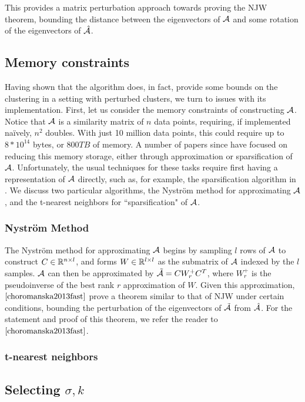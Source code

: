 This provides a matrix perturbation approach towards proving the NJW theorem,
bounding the distance between the eigenvectors of $\mathcal{A}$ and some rotation of
the eigenvectors of $\hat{\mathcal{A}}$.

\subsection{Memory constraints}
Having shown that the algorithm does, in fact, provide some bounds on the
clustering in a setting with perturbed clusters, we turn to issues with its
implementation. First, let us consider the memory constraints of constructing
$\mathcal{A}$. Notice that $\mathcal{A}$ is a similarity matrix of $n$ data points, requiring,
if implemented na\"{i}vely, $n^2$ doubles. With just 10 million data points,
this could require up to $8 * 10^14$ bytes, or $800 TB$ of memory. A number
of papers since have focused on reducing this memory storage, either through
approximation or sparsification of $\mathcal{A}$. Unfortunately, the usual techniques
for these tasks require first having a representation of $\mathcal{A}$ directly, such as,
for example, the sparsification algorithm in \cite{spielman2011graph}. We
discuss two particular algorithms, the Nystr\"{o}m method for approximating
$\mathcal{A}$, and the t-nearest neighbors for ``sparsification" of $\mathcal{A}$.

\subsubsection{Nystr\"{o}m Method}
The Nystr\"{o}m method for approximating $\mathcal{A}$ begins by sampling $l$ rows
of $\mathcal{A}$ to construct $C \in \mathbb{R}^{n \times l}$, and forms $W \in \mathbb{R}^{l \times l}$
as the submatrix of $\mathcal{A}$ indexed by the $l$ samples. $\mathcal{A}$ can then be
approximated by $\tilde{\mathcal{A}} = C W_r^+ C^T$, where $W_r^+$ is the pseudoinverse
of the best rank $r$ approximation of $W$. Given this approximation,
$\cite{choromanska2013fast}$ prove a theorem similar to that of NJW under
certain conditions, bounding the perturbation of the eigenvectors of
$\tilde{\mathcal{A}}$ from $\hat{\mathcal{A}}$. For the statement and proof of this theorem, we
refer the reader to $\cite{choromanska2013fast}$.

\subsubsection{t-nearest neighbors}

\subsection{Selecting $\sigma, k$}

